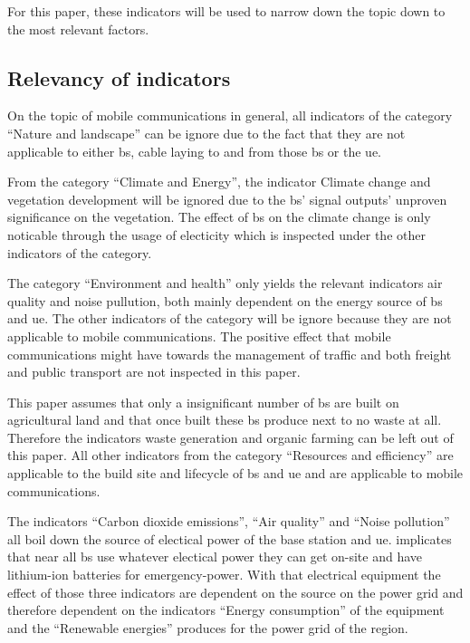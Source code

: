 \documentclass[11pt,a4paper]{article}
\begin{document}
For this paper, these indicators will be used to narrow down the topic down to the most relevant factors.

\subsection{Relevancy of indicators}\label{subsec:relevancy}

On the topic of mobile communications in general, all indicators of the category \enquote{Nature and landscape} can be ignore due to the fact that they are not applicable to either \acrshort{bs}, cable laying to and from those \acrshort{bs} or the \acrshort{ue}.

From the category \enquote{Climate and Energy}, the indicator Climate change and vegetation development will be ignored due to the \acrshort{bs}' signal outputs' unproven significance on the vegetation.
The effect of \acrshort{bs} on the climate change is only noticable through the usage of electicity which is inspected under the other indicators of the category.

The category \enquote{Environment and health} only yields the relevant indicators air quality and noise pullution, both mainly dependent on the energy source of \acrshort{bs} and \acrshort{ue}.
The other indicators of the category will be ignore because they are not applicable to mobile communications.
The positive effect that mobile communications might have towards the management of traffic and both freight and public transport are not inspected in this paper.

This paper assumes that only a insignificant number of \acrshort{bs} are built on agricultural land and that once built these \acrshort{bs} produce next to no waste at all.
Therefore the indicators waste generation and organic farming can be left out of this paper.
All other indicators from the category \enquote{Resources and efficiency} are applicable to the build site and lifecycle of \acrshort{bs} and \acrshort{ue} and are applicable to mobile communications.


The indicators \enquote{Carbon dioxide emissions}, \enquote{Air quality} and \enquote{Noise pollution} all boil down the source of electical power of the base station and \acrshort{ue}.
\citep{powerwhitepaper} implicates that near all \acrshort{bs} use whatever electical power they can get on-site and have lithium-ion batteries for emergency-power.
With that electrical equipment the effect of those three indicators are dependent on the source on the power grid and therefore dependent on the indicators \enquote{Energy consumption} of the equipment and the \enquote{Renewable energies} produces for the power grid of the region.
\end{document}
